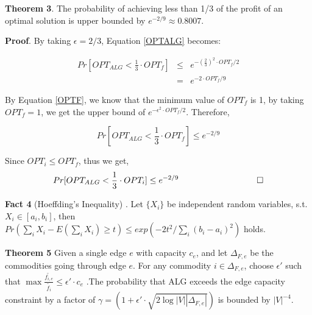 \documentclass[conference]{IEEEtran}
\newcommand*{\QEDB}{\hfill\ensuremath{\square}}%
\begin{document}
\textbf{Theorem 3}. The probability of achieving less than 1/3 of the profit of an optimal solution is upper bounded by $e^{-2/9} \approx 0.8007$.

\textbf{Proof}.
By taking $\epsilon = 2/3$, Equation \ref{OPTALG} becomes:

\begin{eqnarray}
Pr[OPT_{ALG}  < \frac{1}{3} \cdot OPT_f] &\le& e^{-(\frac{2}{3})^2 \cdot OPT_f / 2} \\
&=& e^{-2 \cdot OPT_f/9}
\end{eqnarray}

By Equation \ref{OPTF}, we know that the minimum value of $OPT_f$ is 1, by taking $OPT_f = 1$, we get the upper bound of $e^{-\epsilon^2 \cdot OPT_f / 2}$. Therefore,

\begin{equation}
Pr[OPT_{ALG}  < \frac{1}{3} \cdot OPT_f] \le e^{-2/9}
\end{equation}

Since $OPT_i \le OPT_f$, thus we get, 
\begin{equation}
Pr[OPT_{ALG}  < \frac{1}{3} \cdot OPT_i] \le e^{-2/9}
\,\,\,\,\,\,\,\,\,\,\,\,\,\,\,\,\,\,\,\,\,\,\,\,\,\,\,\,\,\,\,\,\,\,\,\,\,\,\,\,\,\,\,\,\,\,\,\,\,\,\,\,\,\,\,\QEDB \nonumber
\end{equation}



%

\vspace*{0.15in}
\textbf{Fact 4} (Hoeffding's Inequality)\cite{Devdatt} . Let $\{X_i\}$ be independent random variables, s.t. $X_i \in [a_i, b_i]$, then $Pr(\sum_{i}X_i - E(\sum_{i}X_i ) \ge t) \le exp(-2t^2 / \sum_{i}(b_i-a_i)^2 )$ holds.

\vspace*{0.15in}
\textbf{Theorem 5} Given a single edge $e$ with capacity $c_e$, and let $\Delta_{F,e}$ be the commodities going through edge $e$. For any commodity $i \in \Delta_{F,e}$, choose $\epsilon'$ such that $\max \frac{\tilde{f_{i,e}}}{\tilde{f_i}} \le \epsilon' \cdot c_e$ .The probability that ALG exceeds the edge capacity constraint by a factor of $\gamma = (1+\epsilon' \cdot \sqrt{2\log|V||\Delta_{F,e}|})$ is bounded by $|V|^{-4}$.
\vspace*{0.15in}
\end{document}

